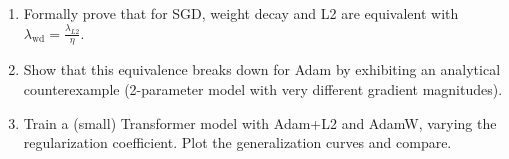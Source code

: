 \begin{exercise}
\begin{enumerate}
  \item Formally prove that for SGD, weight decay and L2 are
    equivalent with $\lambda_{\text{wd}} = \frac{\lambda_{L2}}{\eta}$.
  \item Show that this equivalence breaks down for Adam by exhibiting
    an analytical counterexample (2-parameter model with very
    different gradient magnitudes).
  \item Train a (small) Transformer model with Adam+L2 and AdamW,
    varying the regularization coefficient. Plot the generalization
    curves and compare.
\end{enumerate}
\end{exercise}
